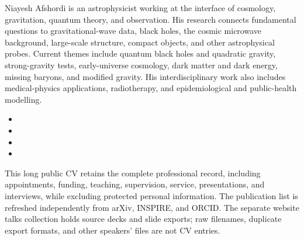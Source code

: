 \documentclass[10pt]{article}
\begin{document}

Niayesh Afshordi is an astrophysicist working at the interface of cosmology,
gravitation, quantum theory, and observation. His research connects fundamental
questions to gravitational-wave data, black holes, the cosmic microwave
background, large-scale structure, compact objects, and other astrophysical
probes. Current themes include quantum black holes and quadratic gravity,
strong-gravity tests, early-universe cosmology, dark matter and dark energy,
missing baryons, and modified gravity.
His interdisciplinary work also includes medical-physics applications,
radiotherapy, and epidemiological and public-health modelling.

\begin{itemize}
  \item {}
  \item {}
  \item {}
  \item {}
\end{itemize}

This long public CV retains the complete professional record, including
appointments, funding, teaching, supervision, service, presentations, and
interviews, while excluding protected personal information. The publication
list is refreshed independently from arXiv, INSPIRE, and ORCID. The separate
website talks collection holds source decks and slide exports; raw filenames,
duplicate export formats, and other speakers' files are not CV entries.




\end{document}
